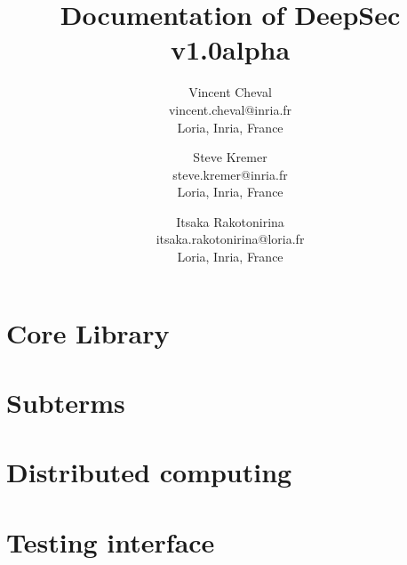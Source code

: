 \documentclass[a4paper,10pt]{book}
\title{Documentation of DeepSec v1.0alpha}
\author{
Vincent Cheval\\
vincent.cheval@inria.fr\\
Loria, Inria, France
\and
Steve Kremer\\
steve.kremer@inria.fr\\
Loria, Inria, France
\and
Itsaka Rakotonirina\\
itsaka.rakotonirina@loria.fr\\
Loria, Inria, France
}
\begin{document}
\maketitle

\tableofcontents

\chapter{Core Library}


\chapter{Subterms}


\chapter{Distributed computing}


\chapter{Testing interface}




\end{document}
